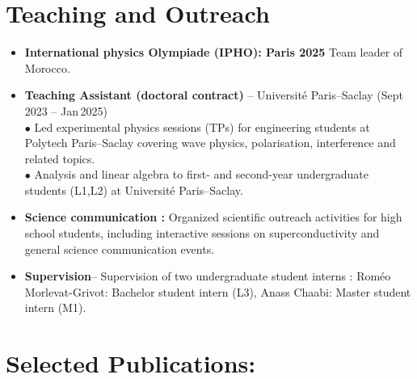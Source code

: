 \documentclass[13pt,a4paper]{article}
\newcommand{\sectitle}[1]{\textcolor{sectiontitlecolor}{#1}}
\newcommand{\jobtitle}[1]{\textcolor{jobblue}{\textbf{#1}}}
\begin{document}
\section*{\sectitle{Teaching and Outreach}}
\begin{itemize}
  \item \jobtitle{International physics Olympiade (IPHO): Paris 2025}
  Team leader of Morocco.
  \item \jobtitle{Teaching Assistant (doctoral contract)} -- Université Paris--Saclay (Sept\,2023 -- Jan\,2025)\\[-0.2ex]
  $\bullet$ Led experimental physics sessions (TPs) for engineering students at Polytech Paris–Saclay covering wave physics, polarisation, interference and related topics.\\
   $\bullet$ Analysis and linear algebra to first- and second-year undergraduate students (L1,L2) at Université Paris–Saclay.\\
  \item \jobtitle{Science communication :} Organized scientific outreach activities for high school students, including interactive sessions on superconductivity and general science communication events.\\
  \item \jobtitle{Supervision}-- Supervision of two undergraduate student interns : Roméo Morlevat-Grivot: Bachelor student intern (L3), Anass Chaabi: Master student intern (M1).
\end{itemize}

\section*{\sectitle{Selected Publications:}}
\end{document}

